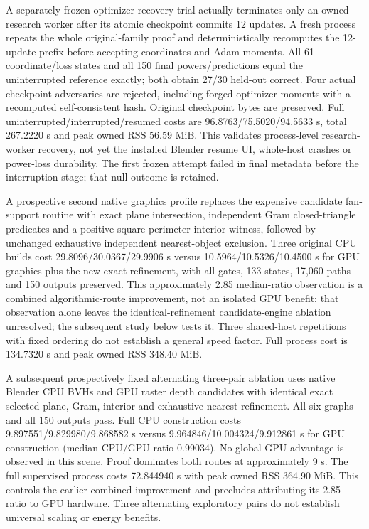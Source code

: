 \documentclass[11pt]{article}
\begin{document}
A separately frozen optimizer recovery trial actually terminates only an owned research worker after its atomic checkpoint commits 12 updates. A fresh process repeats the whole original-family proof and deterministically recomputes the 12-update prefix before accepting coordinates and Adam moments. All 61 coordinate/loss states and all 150 final powers/predictions equal the uninterrupted reference exactly; both obtain 27/30 held-out correct. Four actual checkpoint adversaries are rejected, including forged optimizer moments with a recomputed self-consistent hash. Original checkpoint bytes are preserved. Full uninterrupted/interrupted/resumed costs are 96.8763/75.5020/94.5633 s, total 267.2220 s and peak owned RSS 56.59 MiB. This validates process-level research-worker recovery, not yet the installed Blender resume UI, whole-host crashes or power-loss durability. The first frozen attempt failed in final metadata before the interruption stage; that null outcome is retained.

A prospective second native graphics profile replaces the expensive candidate fan-support routine with exact plane intersection, independent Gram closed-triangle predicates and a positive square-perimeter interior witness, followed by unchanged exhaustive independent nearest-object exclusion. Three original CPU builds cost 29.8096/30.0367/29.9906 s versus 10.5964/10.5326/10.4500 s for GPU graphics plus the new exact refinement, with all gates, 133 states, 17,060 paths and 150 outputs preserved. This approximately 2.85 median-ratio observation is a combined algorithmic-route improvement, not an isolated GPU benefit: that observation alone leaves the identical-refinement candidate-engine ablation unresolved; the subsequent study below tests it. Three shared-host repetitions with fixed ordering do not establish a general speed factor. Full process cost is 134.7320 s and peak owned RSS 348.40 MiB.

A subsequent prospectively fixed alternating three-pair ablation uses native Blender CPU BVHs and GPU raster depth candidates with identical exact selected-plane, Gram, interior and exhaustive-nearest refinement. All six graphs and all 150 outputs pass. Full CPU construction costs 9.897551/9.829980/9.868582 s versus 9.964846/10.004324/9.912861 s for GPU construction (median CPU/GPU ratio 0.99034). No global GPU advantage is observed in this scene. Proof dominates both routes at approximately 9 s. The full supervised process costs 72.844940 s with peak owned RSS 364.90 MiB. This controls the earlier combined improvement and precludes attributing its 2.85 ratio to GPU hardware. Three alternating exploratory pairs do not establish universal scaling or energy benefits.
\end{document}
